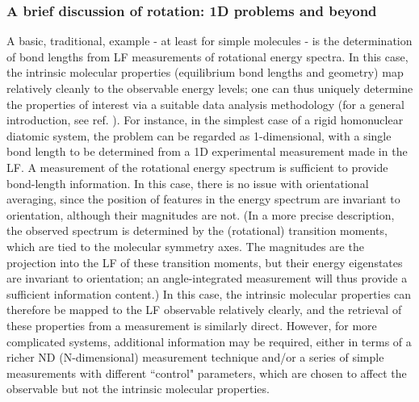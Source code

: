 \documentclass[10pt]{article}
\begin{document}
\subsubsection{A brief discussion of rotation: 1D problems and beyond\label{sec:1D-case}}

A basic, traditional, example - at least for simple molecules - is the determination of bond lengths from LF measurements of rotational energy spectra. In this case, the intrinsic molecular properties (equilibrium bond lengths and geometry) map relatively cleanly to the observable energy levels; one can thus uniquely determine the properties of interest via a suitable data analysis methodology (for a general introduction, see ref. \cite{hollasHighRes}). For instance, in the simplest case of a rigid homonuclear diatomic system, the problem can be regarded as 1-dimensional, with a single bond length to be determined from a 1D experimental measurement made in the LF. A measurement of the rotational energy spectrum is sufficient to provide bond-length information. In this case, there is no issue with orientational averaging, since the position of features in the energy spectrum are invariant to orientation, although their magnitudes are not. 
(In a more precise description, the observed spectrum is determined by the (rotational) transition moments, which are tied to the molecular symmetry axes. The magnitudes are the projection into the LF of these transition moments, but their energy eigenstates are invariant to orientation; an angle-integrated measurement will thus provide a sufficient information content.)
In this case, the intrinsic molecular properties can therefore be mapped to the LF observable relatively clearly, and the retrieval of these properties from a measurement is similarly direct. However, for more complicated systems, additional information may be required, either in terms of a richer ND (N-dimensional) measurement technique and/or a series of simple measurements with different ``control" parameters, which are chosen to affect the observable but not the intrinsic molecular properties.

\end{document}
